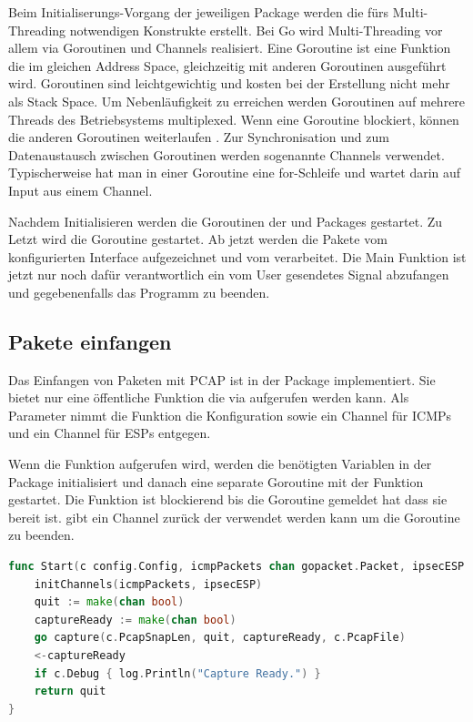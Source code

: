Beim Initialiserungs-Vorgang der jeweiligen Package werden die fürs Multi-Threading notwendigen Konstrukte erstellt. Bei Go wird Multi-Threading vor allem via Goroutinen und Channels realisiert. Eine Goroutine ist eine Funktion die im gleichen Address Space, gleichzeitig mit anderen Goroutinen ausgeführt wird. Goroutinen sind leichtgewichtig und kosten bei der Erstellung nicht mehr als Stack Space. Um Nebenläufigkeit zu erreichen werden Goroutinen auf mehrere Threads des Betriebsystems multiplexed. Wenn eine Goroutine blockiert, können die anderen Goroutinen weiterlaufen \cite[:1391]{effective_go}.
Zur Synchronisation und zum Datenaustausch zwischen Goroutinen werden sogenannte Channels verwendet. Typischerweise hat man in einer Goroutine eine for-Schleife und wartet darin auf Input aus einem Channel.

Nachdem Initialisieren werden die Goroutinen der  und  Packages gestartet. Zu Letzt wird die  Goroutine gestartet. Ab jetzt werden die Pakete vom konfigurierten Interface aufgezeichnet und vom \tool{} verarbeitet. Die Main Funktion ist jetzt nur noch dafür verantwortlich ein vom User gesendetes  Signal abzufangen und gegebenenfalls das Programm zu beenden.

\subsection{Pakete einfangen}
Das Einfangen von Paketen mit \ac{PCAP} ist in der  Package implementiert. Sie bietet nur eine öffentliche Funktion die via  aufgerufen werden kann. Als Parameter nimmt die Funktion die Konfiguration sowie ein Channel für \ac{ICMP}s und ein Channel für \ac{ESP}s entgegen. 

Wenn die Funktion  aufgerufen wird, werden die benötigten Variablen in der  Package initialisiert und danach eine separate Goroutine mit der  Funktion gestartet. Die  Funktion ist blockierend bis die  Goroutine gemeldet hat dass sie bereit ist.  gibt ein Channel zurück der verwendet werden kann um die \linebrea {} Goroutine zu beenden.

\begin{lstlisting}[language=go, caption=Öffentliche Funktion capture.Start()]     
func Start(c config.Config, icmpPackets chan gopacket.Packet, ipsecESP chan gopacket.Packet) chan bool {
	initChannels(icmpPackets, ipsecESP)
	quit := make(chan bool)
	captureReady := make(chan bool)
	go capture(c.PcapSnapLen, quit, captureReady, c.PcapFile)
	<-captureReady
	if c.Debug { log.Println("Capture Ready.") }
	return quit
}
\end{lstlisting}


